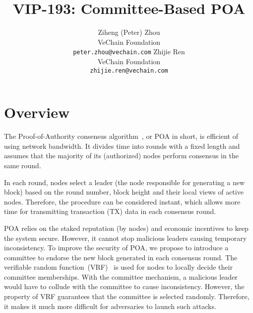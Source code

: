 \documentclass{article}
\title{VIP-193: Committee-Based POA}
\author{
  Ziheng (Peter) Zhou \vspace{1ex}\\
  VeChain Foundation \\
  \texttt{peter.zhou@vechain.com}
  \And
  Zhijie Ren \vspace{1ex} \\
  VeChain Foundation \\
  \texttt{zhijie.ren@vechain.com}
}
\date{\vspace{-5ex}}
\begin{document}
\maketitle




\section{Overview}
The Proof-of-Authority consensus algorithm~\cite{VWP18}, or POA in short, is efficient of using network bandwidth. It divides time into rounds with a fixed length and assumes that the majority of its (authorized) nodes perform consensus in the same round. 

In each round, nodes select a leader (the node responsible for generating a new block) based on the round number, block height and their local views of active nodes. Therefore, the procedure can be considered instant, which allows more time for transmitting transaction (TX) data in each consensus round.

POA relies on the staked reputation (by nodes) and economic incentives to keep the system secure. However, it cannot stop malicious leaders causing temporary inconsistency. To improve the security of POA, we propose to introduce a committee to endorse the new block generated in each consensus round. The verifiable random function~(VRF)~\cite{PapEtAl99} is used for nodes to locally decide their committee memberships. With the committee mechanism, a malicious leader would have to collude with the committee to cause inconsistency. However, the property of VRF guarantees that the committee is selected randomly. Therefore, it makes it much more difficult for adversaries to launch such attacks.  
\end{document}
